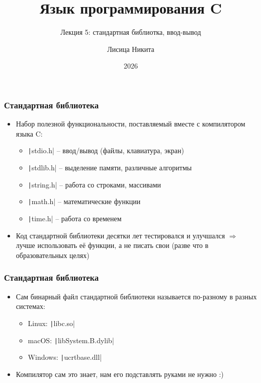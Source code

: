 \documentclass[10pt]{beamer}
\title{Язык программирования C}
\subtitle{Лекция 5: стандартная библиотка, ввод-вывод}
\author{Лисица Никита}
\date{2026}
\begin{document}
\frame{\titlepage}

\begin{frame}[fragile]
\frametitle{Стандартная библиотека}
\begin{itemize}
\item Набор полезной функциональности, поставляемый вместе с компилятором языка C:
\begin{itemize}
\item \texttt|stdio.h| -- ввод/вывод (файлы, клавиатура, экран)
\item \texttt|stdlib.h| -- выделение памяти, различные алгоритмы
\item \texttt|string.h| -- работа со строками, массивами
\item \texttt|math.h| -- математические функции
\item \texttt|time.h| -- работа со временем
\end{itemize}
\pause
\item Код стандартной библиотеки десятки лет тестировался и улучшался \(\Longrightarrow\) лучше использовать её функции, а не писать свои (разве что в образовательных целях)
\end{itemize}
\end{frame}

\begin{frame}[fragile]
\frametitle{Стандартная библиотека}
\begin{itemize}
\item Сам бинарный файл стандартной библиотеки называется по-разному в разных системах:
\begin{itemize}
\item Linux: \texttt|libc.so|
\item macOS: \texttt|libSystem.B.dylib|
\item Windows: \texttt|ucrtbase.dll|
\end{itemize}
\pause
\item Компилятор сам это знает, нам его подставлять руками не нужно :)
\end{itemize}
\end{frame}
\end{document}
